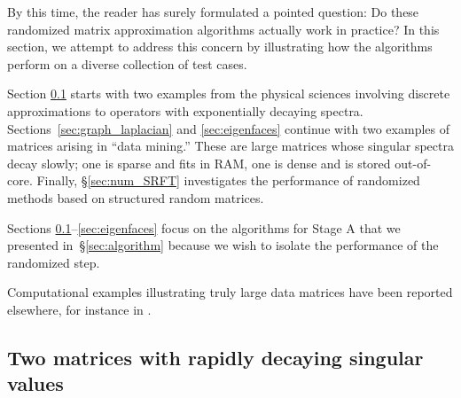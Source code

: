 \documentclass[final]{siamltex}
\newcounter{algorithm}[section]
\newcommand{\pgnotate}[1]{{\color{blue}[#1]}}
\begin{document}
By this time, the reader has surely formulated a pointed question:
Do these randomized matrix approximation algorithms actually work in practice?
In this section, we attempt to address this concern by illustrating
how the algorithms perform on a diverse collection of test cases.

Section \ref{sec:example1} starts with two examples from the physical sciences
involving discrete approximations to operators with exponentially decaying
spectra. Sections~\ref{sec:graph_laplacian} and \ref{sec:eigenfaces} continue
with two examples of matrices arising in ``data mining.'' These are large matrices
whose singular spectra decay slowly; one is sparse and fits in RAM, one is dense
and is stored out-of-core.
Finally, \S\ref{sec:num_SRFT} investigates the performance of randomized methods based
on structured random matrices.

Sections \ref{sec:example1}--\ref{sec:eigenfaces} focus on the algorithms
for Stage A that we presented in~\S\ref{sec:algorithm} because we wish to isolate the performance
of the randomized step.

Computational examples illustrating truly large data matrices have been reported
elsewhere, for instance in \cite{2010_outofcore}.


\subsection{Two matrices with rapidly decaying singular values}
\label{sec:example1}

\end{document}
